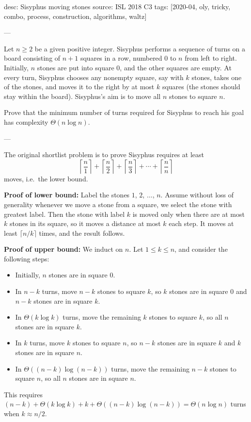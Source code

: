 desc: Sisyphus moving stones
source: ISL 2018 C3
tags: [2020-04, oly, tricky, combo, process, construction, algorithms, waltz]

---

Let $n\ge2$ be a given positive integer. Sisyphus performs a sequence of turns on a board consisting of $n+1$ squares in a row, numbered $0$ to $n$ from left to right. Initially, $n$ stones are put into square $0$, and the other squares are empty. At every turn, Sisyphus chooses any nonempty square, say with $k$ stones, takes one of the stones, and moves it to the right by at most $k$ squares (the stones should stay within the board). Sisyphus's aim is to move all $n$ stones to square $n$.

Prove that the minimum number of turns required for Sisyphus to reach his goal has complexity $\Theta(n\log n)$.

---

\begin{remark}
    The original shortlist problem is to prove Sisyphus requires at least \[\left\lceil\frac n1\right\rceil+\left\lceil\frac n2\right\rceil+\left\lceil\frac n3\right\rceil+\cdots+\left\lceil\frac nn\right\rceil\]
    moves, i.e.\ the lower bound.
\end{remark}

\textbf{Proof of lower bound:} Label the stones $1$, $2$, $\ldots$, $n$. Assume without loss of generality whenever we move a stone from a square, we select the stone with greatest label. Then the stone with label $k$ is moved only when there are at most $k$ stones in its square, so it moves a distance at most $k$ each step. It moves at least $\lceil n/k\rceil$ times, and the result follows.

\bigskip

\textbf{Proof of upper bound:} We induct on $n$. Let $1\le k\le n$, and consider the following steps:
\begin{itemize}
    \item Initially, $n$ stones are in square $0$.
    \item In $n-k$ turns, move $n-k$ stones to square $k$, so $k$ stones are in square $0$ and $n-k$ stones are in square $k$.
    \item In $\Theta(k\log k)$ turns, move the remaining $k$ stones to square $k$, so all $n$ stones are in square $k$.
    \item In $k$ turns, move $k$ stones to square $n$, so $n-k$ stones are in square $k$ and $k$ stones are in square $n$.
    \item In $\Theta( (n-k)\log(n-k))$ turns, move the remaining $n-k$ stones to square $n$, so all $n$ stones are in square $n$.
\end{itemize}
This requires $(n-k)+\Theta(k\log k)+k+\Theta( (n-k)\log(n-k))=\Theta(n\log n)$ turns when $k\approx n/2$.
